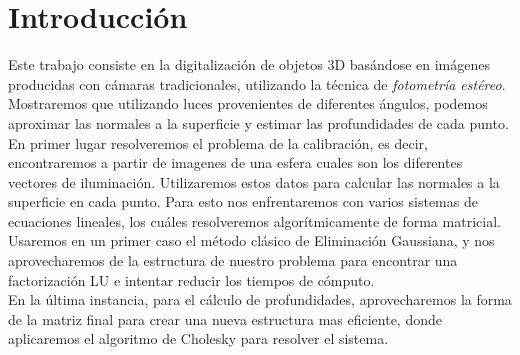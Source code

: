 \section{Introducción}


Este trabajo consiste en la digitalización de objetos 3D basándose en imágenes producidas con cámaras tradicionales, utilizando la técnica de \textit{fotometría estéreo}. Mostraremos que utilizando luces provenientes de diferentes ángulos, podemos aproximar las normales a la superficie y estimar las profundidades de cada punto. \\

En primer lugar resolveremos el problema de la calibración, es decir, encontraremos a partir de imagenes de una esfera cuales son los diferentes vectores de iluminación. Utilizaremos estos datos para calcular las normales a la superficie en cada punto. Para esto nos enfrentaremos con varios sistemas de ecuaciones lineales, los cuáles resolveremos algorítmicamente de forma matricial. Usaremos en un primer caso el método clásico de Eliminación Gaussiana, y nos aprovecharemos de la estructura de nuestro problema para encontrar una factorización LU e intentar reducir los tiempos de cómputo. \\

En la última instancia, para el cálculo de profundidades, aprovecharemos la forma de la matriz final para crear una nueva estructura mas eficiente, donde aplicaremos el algoritmo de Cholesky para resolver el sistema. \\
